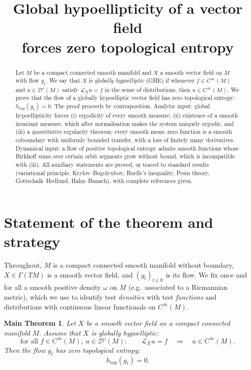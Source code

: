 \documentclass[11pt]{amsart}
\theoremstyle{plain}
\newtheorem*{mainthm}{Main Theorem}
\theoremstyle{definition}
\theoremstyle{remark}
\newcommand{\DD}{\mathcal{D}'}
\newcommand{\flow}{g_t}
\newcommand{\Lie}{\mathcal{L}}
\begin{document}
\title{Global hypoellipticity of a vector field\\ forces zero topological entropy}
\author{}
\date{}
\maketitle

\begin{abstract}
Let $M$ be a compact connected smooth manifold and $X$ a smooth vector
field on $M$ with flow $\flow$.  We say that $X$ is \emph{globally
hypoelliptic} (GHE) if whenever $f\in C^\infty(M)$ and
$u\in\DD(M)$ satisfy $\Lie_X u=f$ in the sense of distributions, then
$u\in C^\infty(M)$.  We prove that the flow of a globally
hypoelliptic vector field has zero topological entropy:
$h_{\mathrm{top}}(\flow)=0$.  The proof proceeds by contraposition.
Analytic input: global hypoellipticity forces (i) ergodicity of every
smooth measure, (ii) existence of a smooth invariant measure, which
after normalisation makes the system uniquely ergodic, and (iii) a
\emph{quantitative} regularity theorem: every smooth mean--zero
function is a smooth coboundary with uniformly bounded transfer, with
a loss of finitely many derivatives.  Dynamical input: a flow of
positive topological entropy admits smooth functions whose Birkhoff
sums over certain orbit segments grow without bound, which is
incompatible with (iii).  All auxiliary statements are proved, or
traced to standard results (variational principle, Krylov--Bogolyubov,
Ruelle's inequality, Pesin theory, Gottschalk--Hedlund, Hahn--Banach),
with complete references given.
\end{abstract}

\tableofcontents

\section{Statement of the theorem and strategy}\label{s:strategy}

Throughout, $M$ is a compact connected smooth manifold without
boundary, $X\in \Gamma(TM)$ is a smooth vector field, and
$(\flow)_{t\in\mathbb{R}}$ is its flow.  We fix once and for all a
smooth positive density $\omega$ on $M$ (e.g.\ associated to a
Riemannian metric), which we use to identify test \emph{densities}
with test \emph{functions} and distributions with continuous linear
functionals on $C^\infty(M)$.

\begin{mainthm}\label{thm:main}
Let $X$ be a smooth vector field on a compact connected manifold $M$.
Assume that $X$ is \emph{globally hypoelliptic}: 
\begin{equation}\label{eq:GHE}
\text{for all } f\in C^\infty(M),\ u\in\DD(M):\qquad
\Lie_X u=f \quad\Longrightarrow\quad u\in C^\infty(M).
\end{equation}
Then the flow $\flow$ has zero topological entropy:
\[
h_{\mathrm{top}}(\flow)=0 .
\]
\end{mainthm}
\end{document}
